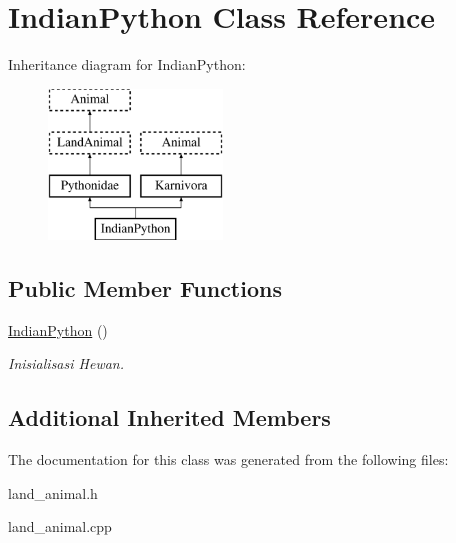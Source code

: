 \hypertarget{class_indian_python}{}\section{Indian\+Python Class Reference}
\label{class_indian_python}
Inheritance diagram for Indian\+Python\+:\begin{figure}[H]
\begin{center}
\leavevmode
\includegraphics[height=4.000000cm]{class_indian_python}
\end{center}
\end{figure}
\subsection*{Public Member Functions}
\begin{DoxyCompactItemize}
\item 
\hyperlink{class_indian_python_a2384f82da43f7ccd9cf19bfacc7bc280}{Indian\+Python} ()\hypertarget{class_indian_python_a2384f82da43f7ccd9cf19bfacc7bc280}{}\label{class_indian_python_a2384f82da43f7ccd9cf19bfacc7bc280}

\begin{DoxyCompactList}\small\item\em Inisialisasi Hewan. \end{DoxyCompactList}\end{DoxyCompactItemize}
\subsection*{Additional Inherited Members}


The documentation for this class was generated from the following files\+:\begin{DoxyCompactItemize}
\item 
land\+\_\+animal.\+h\item 
land\+\_\+animal.\+cpp\end{DoxyCompactItemize}
